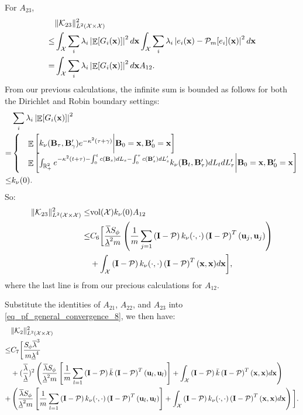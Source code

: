 \documentclass[aos,preprint]{imsart}
\theoremstyle{plain}
\DeclareMathOperator{\E}{\mathbb E}
\newcommand{\Real}{\mathbb R}
\newcommand{\CalX}{\mathcal X}
\newcommand{\CalP}{\mathcal P}
\newcommand{\CalK}{\mathcal K}
\newcommand{\Bx}{\bold x}
\newcommand{\BFx}{\bold x}
\newcommand{\BB}{\bold B}
\newcommand{\Bu}{\bold u}
\theoremstyle{remark}
\begin{document}
\begin{appendix}
For $A_{23}$,
\begin{align*}
    &\|\CalK_{23}\|^2_{L^2(\CalX\times\CalX)}\\ \leq &\int_\CalX \sum_i\lambda_i\left|\E[G_i(\BFx)]\right|^2d \BFx \int_\CalX \sum_i\lambda_i\left|e_i(\BFx)-\CalP_m[e_i](\BFx)\right|^2d\BFx\\
    =& \int_\CalX \sum_i\lambda_i\left|\E[G_i(\BFx)]\right|^2d \BFx  A_{12}.\\
    \end{align*}
From our previous calculations, the infinite sum is bounded as follows for both the Dirichlet and Robin boundary settings:
\begin{align*}
    & \sum_i\lambda_i\left|\E[G_i(\BFx)]\right|^2 \\
    = &\begin{cases}
        &\E\left[k_\nu(\BB_\tau,\BB_\gamma')e^{-\kappa^2(\tau+\gamma)}\bigg|\BB_0=\Bx,\BB'_0=\Bx\right]\\
        &\E\left[\int_{\Real_+^2}e^{-\kappa^2(t+\tau)-\int_0^tc(\BB_s)dL_s-\int_0^\tau c(\BB'_s)dL'_s}k_\nu(\BB_t,\BB'_\tau)dL_tdL'_\tau\bigg|\BB_0=\BFx,\BB'_0=\BFx\right]
    \end{cases}\\
    \leq &k_\nu(0).
\end{align*}
So:
\begin{align*}
    \|\CalK_{23}\|^2_{L^2(\CalX\times\CalX)}\leq & \text{vol}(\CalX)k_\nu(0) A_{12}\\
    \leq& C_6 \bigg[\frac{\overline{\lambda}S_\phi}{\underline{\lambda}^2m}\left(\frac{1}{m}\sum_{j=1}\left(\bold{I}-\CalP\right)k_\nu(\cdot,\cdot)\left(\bold{I}-\CalP\right)^T(\Bu_j,\Bu_j)\right)\\
    &+\int_\CalX\left(\bold{I}-\CalP\right)k_\nu(\cdot,\cdot)\left(\bold{I}-\CalP\right)^T(\BFx,\BFx)d\Bx\bigg],
\end{align*}
where the last line is from our precious calculations for $A_{12}$.

Substitute the identities of $A_{21}$, $A_{22}$, and $A_{23}$ into \eqref{eq_pf_general_convergence_8}, we then have:
\begin{align}
    &\|\CalK_2\|^2_{L^2(\CalX\times\CalX)}\label{eq_pf_general_convergence_9}\\
    \leq & C_7\bigg[\frac{S_\phi\overline{\lambda}^3}{m\underline{\lambda}^4}\nonumber\\
    &+(\frac{\overline{\lambda}}{\underline{\lambda}})^2\left(\frac{\overline{\lambda}S_\phi}{\underline{\lambda}^2m}\left[\frac{1}{m}\sum_{l=1}\left(\bold{I}-\CalP\right)\bar{k}\left(\bold{I}-\CalP\right)^T(\Bu_l,\Bu_l)\right]+\int_\CalX\left(\bold{I}-\CalP\right)\bar{k}\left(\bold{I}-\CalP\right)^T(\BFx,\BFx)d\Bx\right)\nonumber\\
    +& \left(\frac{\overline{\lambda}S_\phi}{\underline{\lambda}^2m}\left[\frac{1}{m}\sum_{l=1}\left(\bold{I}-\CalP\right)k_\nu(\cdot,\cdot)\left(\bold{I}-\CalP\right)^T(\Bu_l,\Bu_l)\right]+\int_\CalX\left(\bold{I}-\CalP\right)k_\nu(\cdot,\cdot)\left(\bold{I}-\CalP\right)^T(\BFx,\BFx)d\Bx\right)\bigg]. \nonumber
\end{align}


\end{appendix}
\end{document}
